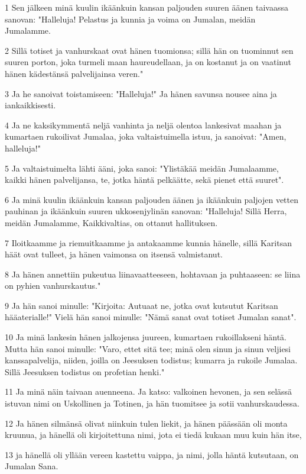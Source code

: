 \par 1 Sen jälkeen minä kuulin ikäänkuin kansan paljouden suuren äänen taivaassa sanovan: "Halleluja! Pelastus ja kunnia ja voima on Jumalan, meidän Jumalamme.
\par 2 Sillä totiset ja vanhurskaat ovat hänen tuomionsa; sillä hän on tuominnut sen suuren porton, joka turmeli maan haureudellaan, ja on kostanut ja on vaatinut hänen kädestänsä palvelijainsa veren."
\par 3 Ja he sanoivat toistamiseen: "Halleluja!" Ja hänen savunsa nousee aina ja iankaikkisesti.
\par 4 Ja ne kaksikymmentä neljä vanhinta ja neljä olentoa lankesivat maahan ja kumartaen rukoilivat Jumalaa, joka valtaistuimella istuu, ja sanoivat: "Amen, halleluja!"
\par 5 Ja valtaistuimelta lähti ääni, joka sanoi: "Ylistäkää meidän Jumalaamme, kaikki hänen palvelijansa, te, jotka häntä pelkäätte, sekä pienet että suuret".
\par 6 Ja minä kuulin ikäänkuin kansan paljouden äänen ja ikäänkuin paljojen vetten pauhinan ja ikäänkuin suuren ukkosenjylinän sanovan: "Halleluja! Sillä Herra, meidän Jumalamme, Kaikkivaltias, on ottanut hallituksen.
\par 7 Iloitkaamme ja riemuitkaamme ja antakaamme kunnia hänelle, sillä Karitsan häät ovat tulleet, ja hänen vaimonsa on itsensä valmistanut.
\par 8 Ja hänen annettiin pukeutua liinavaatteeseen, hohtavaan ja puhtaaseen: se liina on pyhien vanhurskautus."
\par 9 Ja hän sanoi minulle: "Kirjoita: Autuaat ne, jotka ovat kutsutut Karitsan hääaterialle!" Vielä hän sanoi minulle: "Nämä sanat ovat totiset Jumalan sanat".
\par 10 Ja minä lankesin hänen jalkojensa juureen, kumartaen rukoillakseni häntä. Mutta hän sanoi minulle: "Varo, ettet sitä tee; minä olen sinun ja sinun veljiesi kanssapalvelija, niiden, joilla on Jeesuksen todistus; kumarra ja rukoile Jumalaa. Sillä Jeesuksen todistus on profetian henki."
\par 11 Ja minä näin taivaan auenneena. Ja katso: valkoinen hevonen, ja sen selässä istuvan nimi on Uskollinen ja Totinen, ja hän tuomitsee ja sotii vanhurskaudessa.
\par 12 Ja hänen silmänsä olivat niinkuin tulen liekit, ja hänen päässään oli monta kruunua, ja hänellä oli kirjoitettuna nimi, jota ei tiedä kukaan muu kuin hän itse,
\par 13 ja hänellä oli yllään vereen kastettu vaippa, ja nimi, jolla häntä kutsutaan, on Jumalan Sana.

